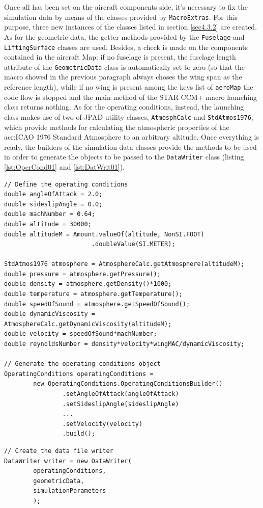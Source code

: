 \bigskip
\noindent
Once all has been set on the aircraft components side, it's necessary to fix the simulation data by means of the classes provided by \lstinline[language=Java]!MacroExtras!. For this purpose, three new instances of the classes listed in section \ref{sec4.3.2} are created. As for the geometric data, the getter methods provided by the \lstinline[language=Java]!Fuselage! and \lstinline[language=Java]!LiftingSurface! classes are used. Besides, a check is made on the components contained in the aircraft \gls{Map}: if no fuselage is present, the fuselage length attribute of the \lstinline[language=Java]!GeometricData! class is automatically set to zero (so that the macro showed in the previous paragraph always choses the wing span as the reference length), while if no wing is present among the keys list of \lstinline[language=Java]!aeroMap! the code flow is stopped and the main method of the STAR-CCM+ macro launching class returns nothing. As for the operating conditions, instead, the launching class makes use of two of \gls{JPAD} utility classes, \lstinline[language=Java]!AtmosphCalc! and \lstinline[language=Java]!StdAtmos1976!, which provide methods for calculating the atmospheric properties of the \gls{acr:ICAO} 1976 Standard Atmosphere to an arbitrary altitude. Once everything is ready, the builders of the simulation data classes provide the methods to be used in order to generate the objects to be passed to the \lstinline[language=Java]!DataWriter! class (listing \ref{lst:OperCond01} and \ref{lst:DatWrit01}).
%
\bigskip
\begin{lstlisting}[caption={Instantiate a new \lstinline!OperatingConditions! object}, captionpos=b, tabsize=2, label={lst:OperCond01}]
// Define the operating conditions
double angleOfAttack = 2.0;
double sideslipAngle = 0.0;
double machNumber = 0.64;
double altitude = 30000; 
double altitudeM = Amount.valueOf(altitude, NonSI.FOOT)
						.doubleValue(SI.METER);
		
StdAtmos1976 atmosphere = AtmosphereCalc.getAtmosphere(altitudeM);
double pressure = atmosphere.getPressure();
double density = atmosphere.getDensity()*1000;
double temperature = atmosphere.getTemperature();
double speedOfSound = atmosphere.getSpeedOfSound();
double dynamicViscosity = AtmosphereCalc.getDynamicViscosity(altitudeM);
double velocity = speedOfSound*machNumber;
double reynoldsNumber = density*velocity*wingMAC/dynamicViscosity;

// Generate the operating conditions object
OperatingConditions operatingConditions = 
		new OperatingConditions.OperatingConditionsBuilder()
				.setAngleOfAttack(angleOfAttack)
				.setSideslipAngle(sideslipAngle)
				...
				.setVelocity(velocity)
				.build();
\end{lstlisting}
%
\bigskip
\begin{lstlisting}[caption={Instantiate a new \lstinline!DataWriter! object}, captionpos=b, tabsize=2, label={lst:DatWrit01}]
// Create the data file writer
DataWriter writer = new DataWriter(
		operatingConditions, 
		geometricData, 
		simulationParameters			
		);
\end{lstlisting}
%

